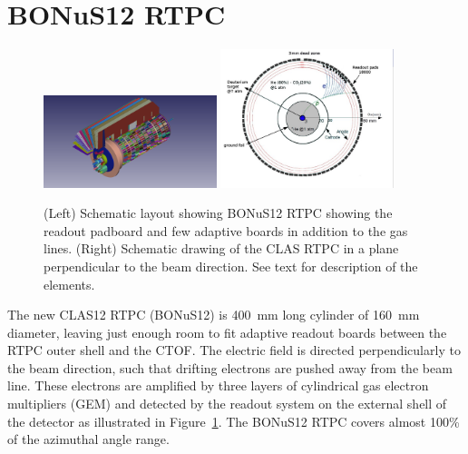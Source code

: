 \section{BONuS12 RTPC} 

\begin{figure}
  \begin{center}
    \includegraphics[angle=0, width=0.45\textwidth, clip,trim=50mm 10mm 80mm 
     0mm]{figures/Bonus12_cad.png}
    \includegraphics[angle=0, width=0.45\textwidth,clip,trim=0mm 10mm 20mm 0mm 
     ]{figures/NKsBXp.png}
     \caption{(Left) Schematic layout showing BONuS12 RTPC showing the readout 
     padboard and few adaptive boards in addition to the gas lines. (Right) 
     Schematic drawing of the CLAS RTPC in a plane perpendicular to the beam 
     direction. See text for description of the elements.}
    \label{fig:bonus12}
  \end{center}
\end{figure}

The new CLAS12 RTPC (BONuS12) is 400~mm long cylinder of 160~mm diameter, 
leaving just enough room to fit adaptive readout boards between the RTPC outer 
shell and the CTOF. The electric field is directed perpendicularly to the beam 
direction, such that drifting electrons are pushed away from the beam line.  
These electrons are amplified by three layers of cylindrical gas electron 
multipliers (GEM) and detected by the readout system on the external shell of 
the detector as illustrated in Figure~\ref{fig:bonus12}. The BONuS12 RTPC 
covers almost 100\% of the azimuthal angle range.

